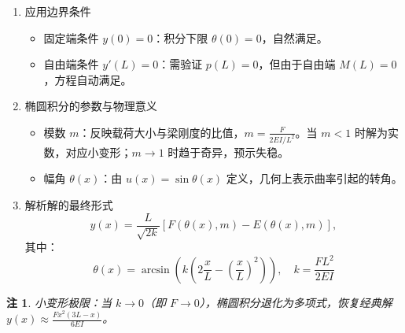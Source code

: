 \documentclass[12pt, a4paper,oneside, UTF8]{ctexart} %
\newtheorem*{zhu}{\indent \textcolor{b1}{注}}
\begin{document}
\begin{enumerate}
    \item  应用边界条件
    \begin{itemize}
        \item 固定端条件 \(y(0) = 0\)：积分下限 \(\theta(0) = 0\)，自然满足。
        \item 自由端条件 \(y'(L) = 0\)：需验证 \(p(L) = 0\)，但由于自由端 \(M(L)=0\)，方程自动满足。
    \end{itemize}
    
    \item  椭圆积分的参数与物理意义
    \begin{itemize}
        \item 模数 \(m\)：反映载荷大小与梁刚度的比值，\(m = \frac{F}{2EI/L^2}\)。当 \(m < 1\) 时解为实数，对应小变形；\(m \to 1\) 时趋于奇异，预示失稳。
        \item 幅角 \(\theta(x)\)：由 \(u(x) = \sin\theta(x)\) 定义，几何上表示曲率引起的转角。
    \end{itemize}
    
    \item  解析解的最终形式
    \[
    y(x) = \frac{L}{\sqrt{2k}} \left[ F\left(\theta(x), m\right) - E\left(\theta(x), m\right) \right],
    \]
    其中：
    \[
    \theta(x) = \arcsin\left( k \left(2\frac{x}{L} - \left(\frac{x}{L}\right)^2 \right) \right), \quad k = \frac{F L^2}{2EI} 
    \]
\end{enumerate}
\begin{zhu}
    小变形极限：当 \(k \to 0\)（即 \(F \to 0\)），椭圆积分退化为多项式，恢复经典解 \( y(x) \approx \frac{Fx^2(3L - x)}{6EI} \)。
\end{zhu}
\end{document}
